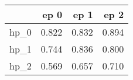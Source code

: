 \begin{tabular}{lrrr}
\toprule
{} &   ep 0 &   ep 1 &   ep 2 \\
\midrule
hp\_0 &  0.822 &  0.832 &  0.894 \\
hp\_1 &  0.744 &  0.836 &  0.800 \\
hp\_2 &  0.569 &  0.657 &  0.710 \\
\bottomrule
\end{tabular}
